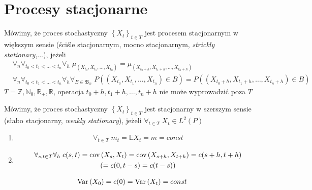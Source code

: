\section{Procesy stacjonarne}
\begin{defi}
Mówimy, że proces stochastyczny $ \left\{X_t\right\} _{t\in T}$ jest procesem stacjonarnym w większym sensie (ściśle stacjonarnym, mocno stacjonarnym, \emph{strickly stationary},...), jeżeli
\begin{align*}
&\forall_n\forall_{t_0<t_1<\dots<t_n}\forall_h\;
\mu_{\left(X_{t_0},X_{t_1},\dots,X_{t_n}\right)}=
\mu_{\left(X_{t_0+h},X_{t_1+h},\dots,X_{t_n+h}\right)}\\
&\forall_n\forall_{t_0<t_1<\dots<t_n}\forall_h\forall_{B\in\mathfrak B_\mathbb R }\;
P\left(\left(X_{t_0},X_{t_1},\dots,X_{t_n}\right)\in B\right)=
P\left(\left(X_{t_0+h},X_{t_1+h},\dots,X_{t_n+h}\right)\in B\right)
\end{align*}
$ T=\mathbb Z,\mathbb N _0,\mathbb R _+,\mathbb R  $, operacja $ t_0+h,t_1+h,\dots,t_n+h $ nie może wyprowadzić poza $ T $
\end{defi}
\begin{defi}
Mówimy, że proces stochastyczny $ \left\{X_t\right\} _{t\in T}$ jest stacjonarny w szerszym sensie (słabo stacjonarny, \emph{weakly stationary}), jeżeli $ \forall_{t\in T}\; X_t\in L^2(P) $
\begin{enumerate}
\item 
\begin{gather*}
\forall_{t\in T}\;m_t=\mathbb E X_t=m=const
\end{gather*}
\item 
\begin{gather*}
\forall_{s,t\in T}\forall_h\;
c(s,t)=
\text{cov} \left(X_s,X_t\right)=
\text{cov} \left(X_{s+h},X_{t+h}\right)=
c(s+h,t+h)\\
\left(=c(0,t-s)=c(t-s)\right)
\end{gather*}
\end{enumerate}
\begin{gather*}
\text{Var}\left(X_0\right)=c(0)=\text{Var}\left(X_t\right)=const
\end{gather*}
\end{defi}
